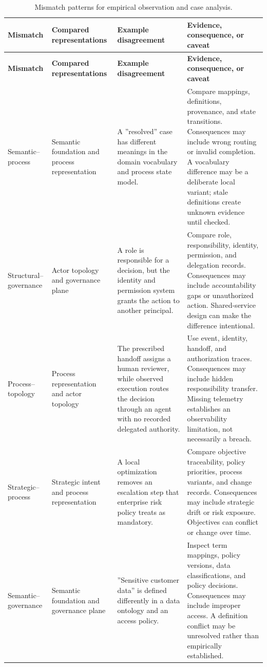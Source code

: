 \documentclass[11pt,letterpaper]{article}
\begin{document}
\begingroup
\scriptsize
\setlength{\tabcolsep}{2pt}
\renewcommand{\arraystretch}{1.15}
\begin{longtable}{P{0.15\textwidth} P{0.18\textwidth} P{0.27\textwidth} P{0.30\textwidth}}
\caption{Mismatch patterns for empirical observation and case analysis.}\label{tab:mismatches}\\
\toprule
\textbf{Mismatch} & \textbf{Compared representations} & \textbf{Example disagreement} & \textbf{Evidence, consequence, or caveat} \\
\midrule
\endfirsthead
\toprule
\textbf{Mismatch} & \textbf{Compared representations} & \textbf{Example disagreement} & \textbf{Evidence, consequence, or caveat} \\
\midrule
\endhead
Semantic--process & Semantic foundation and process representation & A ''resolved'' case has different meanings in the domain vocabulary and process state model. & Compare mappings, definitions, provenance, and state transitions. Consequences may include wrong routing or invalid completion. A vocabulary difference may be a deliberate local variant; stale definitions create unknown evidence until checked. \\
Structural--governance & Actor topology and governance plane & A role is responsible for a decision, but the identity and permission system grants the action to another principal. & Compare role, responsibility, identity, permission, and delegation records. Consequences may include accountability gaps or unauthorized action. Shared-service design can make the difference intentional. \\
Process--topology & Process representation and actor topology & The prescribed handoff assigns a human reviewer, while observed execution routes the decision through an agent with no recorded delegated authority. & Use event, identity, handoff, and authorization traces. Consequences may include hidden responsibility transfer. Missing telemetry establishes an observability limitation, not necessarily a breach. \\
Strategic--process & Strategic intent and process representation & A local optimization removes an escalation step that enterprise risk policy treats as mandatory. & Compare objective traceability, policy priorities, process variants, and change records. Consequences may include strategic drift or risk exposure. Objectives can conflict or change over time. \\
Semantic--governance & Semantic foundation and governance plane & ''Sensitive customer data'' is defined differently in a data ontology and an access policy. & Inspect term mappings, policy versions, data classifications, and policy decisions. Consequences may include improper access. A definition conflict may be unresolved rather than empirically established. \\

\end{longtable}
\end{document}
